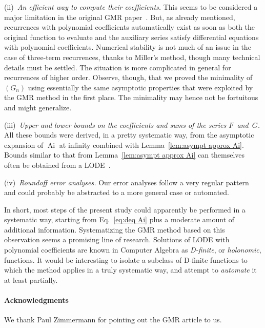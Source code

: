 \documentclass[10pt, conference]{IEEEtran}
\DeclareMathOperator{\Ai}{Ai}
\begin{document}
(ii)~\emph{An efficient way to compute their coefficients.}
This seems to be considered a major limitation in the original GMR paper~\cite{GawronskiMullerReinhard2007}.
But, as already mentioned, recurrences with polynomial coefficients automatically exist as soon as both the original function to evaluate and the auxiliary series satisfy differential equations with polynomial coefficients.
Numerical stability is not much of an issue in the case of three-term recurrences, thanks to Miller's method, though many technical details must be settled.
The situation is more complicated in general for recurrences of higher order.
Observe, though, that we proved the minimality of $(G_n)$ using essentially the same asymptotic properties that were exploited by the GMR method in the first place.
The minimality may hence not be fortuitous and might generalize.

(iii)~\emph{Upper and lower bounds on the coefficients and sums of the series
$F$~and~$G$.}
All these bounds were derived, in a pretty systematic way, from the asymptotic expansion of $\Ai$ at infinity combined with Lemma~\ref{lem:asympt approx Ai}.
Bounds similar to that from Lemma~\ref{lem:asympt approx Ai} can themselves often be obtained from a LODE~\cite{Olver1997}.

(iv)~\emph{Roundoff error analyses.}
Our error analyses follow a very regular pattern and could probably be abstracted to a more general case or automated.

In short, most steps of the present study could apparently be performed in a systematic way, starting from Eq.~\eqref{eq:deq Ai} plus a moderate amount of additional information.
Systematizing the GMR method based on this observation seems a promising line of research.
Solutions of LODE with polynomial coefficients are known in Computer Algebra as \emph{D{-}finite}, or \emph{holonomic}, functions.
It would be interesting to isolate a subclass of D-finite functions to which the method applies in a truly systematic way, and attempt to \emph{automate} it at least partially.

\paragraph*{Acknowledgments}

We thank Paul Zimmermann for pointing out the GMR article to us.


\end{document}
